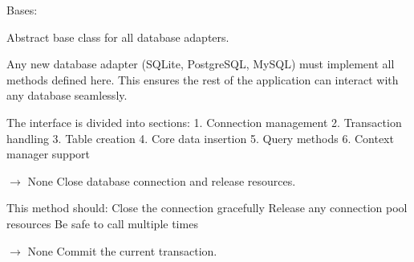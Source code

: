 \documentclass[letterpaper,10pt,english]{sphinxmanual}
\begin{document}
\begin{fulllineitems}
\label{\detokenize{core.database.base:core.database.base.DatabaseInterface}}
\pysigstartsignatures
\pysigline
{}
\pysigstopsignatures
\sphinxAtStartPar
Bases: 

\sphinxAtStartPar
Abstract base class for all database adapters.

\sphinxAtStartPar
Any new database adapter (SQLite, PostgreSQL, MySQL) must implement
all methods defined here. This ensures the rest of the application
can interact with any database seamlessly.

\sphinxAtStartPar
The interface is divided into sections:
1. Connection management
2. Transaction handling
3. Table creation
4. Core data insertion
5. Query methods
6. Context manager support

\begin{fulllineitems}
\label{\detokenize{core.database.base:core.database.base.DatabaseInterface.close}}
\pysigstartsignatures
\pysiglinewithargsret
{}
{}
{{ $\rightarrow$ None}}
\pysigstopsignatures
\sphinxAtStartPar
Close database connection and release resources.

\sphinxAtStartPar
This method should:
\sphinxhyphen{} Close the connection gracefully
\sphinxhyphen{} Release any connection pool resources
\sphinxhyphen{} Be safe to call multiple times

\end{fulllineitems}


\begin{fulllineitems}
\label{\detokenize{core.database.base:core.database.base.DatabaseInterface.commit}}
\pysigstartsignatures
\pysiglinewithargsret
{}
{}
{{ $\rightarrow$ None}}
\pysigstopsignatures
\sphinxAtStartPar
Commit the current transaction.


\end{fulllineitems}
\end{fulllineitems}
\end{document}
